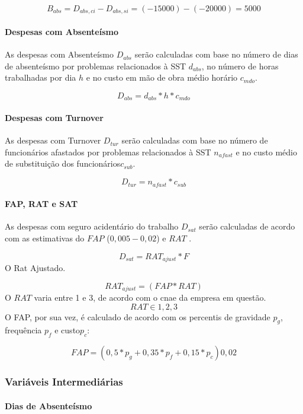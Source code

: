 \documentclass[]{article}
\let\oldparagraph\paragraph
\renewcommand{\paragraph}[1]{\oldparagraph{#1}\mbox{}}
\begin{document}
\[B_{abs} = {D}_{abs, ci} - {D}_{abs, si} = (-15000)-(-20000) = 5000\]

\paragraph{Despesas com Absenteísmo}\label{despesas-com-absenteismo}

As despesas com Absenteísmo \(D_{abs}\) serão calculadas com base no
número de dias de absenteísmo por problemas relacionados à SST
\(d_{abs}\), no número de horas trabalhadas por dia \(h\) e no custo em
mão de obra médio horário \(c_{mdo}\).

\[D_{abs} = d_{abs} * h * c_{mdo}\]

\paragraph{Despesas com Turnover}\label{despesas-com-turnover}

As despesas com Turnover \(D_{tur}\) serão calculadas com base no número
de funcionários afastados por problemas relacionados à SST \(n_{afast}\)
e no custo médio de substituição dos funcionários\(c_{sub}\).

\[D_{tur} = n_{afast} * c_{sub}\]

\paragraph{FAP, RAT e SAT}\label{fap-rat-e-sat}

As despesas com seguro acidentário do trabalho \(D_{sat}\) serão
calculadas de acordo com as estimativas do \(FAP\) (\(0,005 - 0,02\)) e
\(RAT\) .

\[D_{sat} = RAT_{ajust}* F\] O Rat Ajustado.

\[RAT_{ajust} = (FAP * RAT)\] O \(RAT\) varia entre 1 e 3, de acordo com
o cnae da empresa em questão. \[RAT \in {1,2,3}\] O FAP, por sua vez, é
calculado de acordo com os percentis de gravidade \(p_g\), frequência
\(p_{f}\) e custo\(p_c\):

\[FAP = (0,5*p_g + 0,35*p_{f}+0,15*p_c)0,02\]

\subsubsection{Variáveis Intermediárias}\label{variaveis-intermediarias}

\paragraph{Dias de Absenteísmo}\label{dias-de-absenteismo}
\end{document}
